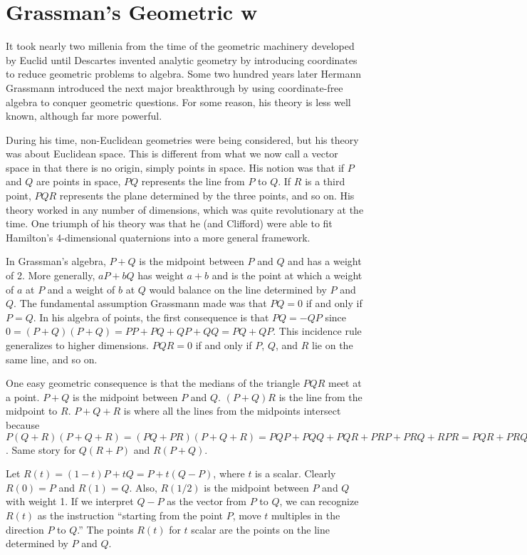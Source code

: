 \chapter{Grassman's Geometric w} 
\label{ga}

It took nearly two millenia from the time of the geometric machinery
developed by Euclid until Descartes invented analytic geometry by
introducing coordinates to reduce geometric problems to algebra. Some
two hundred years later Hermann Grassmann introduced the next major
breakthrough by using coordinate-free algebra to conquer geometric
questions. For some reason, his theory is less well known, although far
more powerful.

During his time, non-Euclidean geometries were being considered, but
his theory was about Euclidean space. This is different from what we now
call a vector space in that there is no origin, simply points in space.
His notion was that if $P$ and $Q$ are points in space, $PQ$ represents
the line from $P$ to $Q$. If $R$ is a third point, $PQR$ represents the
plane determined by the three points, and so on. His theory worked in any
number of dimensions, which was quite revolutionary at the time. One
triumph of his theory was that he (and Clifford) were able to fit
Hamilton's 4-dimensional quaternions into a more general framework.

In Grassman's algebra, $P + Q$ is the midpoint between $P$ and $Q$ and
has a weight of 2. More generally, $aP + bQ$ has weight $a + b$ and is
the point at which a weight of $a$ at $P$ and a weight of $b$ at $Q$ would
balance on the line determined by $P$ and $Q$. The fundamental assumption
Grassmann made was that $PQ = 0$ if and only if $P = Q$. In his
algebra of points, the first consequence is that $PQ
= -QP$ since $0 = (P + Q)(P + Q) = PP + PQ + QP + QQ = PQ + QP$. This
incidence rule generalizes to higher dimensions.  $PQR = 0$ if and only
if $P$, $Q$, and $R$ lie on the same line, and so on.

One easy geometric consequence is that the medians of the triangle $PQR$
meet at a point.  $P + Q$ is the midpoint between $P$ and $Q$. $(P +
Q)R$ is the line from the midpoint to $R$. $P + Q + R$ is where all
the lines from the midpoints intersect because $P(Q + R)(P + Q + R) =
(PQ + PR)(P + Q + R) = PQP + PQQ + PQR + PRP + PRQ + RPR = PQR + PRQ =
P(QR + RQ) = 0$. Same story for $Q(R + P)$ and $R(P + Q)$.

Let $R(t) = (1 - t)P + tQ = P + t(Q - P)$, where $t$ is a scalar.
Clearly $R(0) = P$ and $R(1) = Q$. Also, $R(1/2)$ is the midpoint
between $P$ and $Q$ with weight 1.  If we interpret $Q - P$ as the vector
from $P$ to $Q$, we can recognize $R(t)$ as the instruction ``starting
from the point $P$, move $t$ multiples in the direction $P$ to $Q$.''
The points $R(t)$ for $t$ scalar are the points on the line determined
by $P$ and $Q$.

